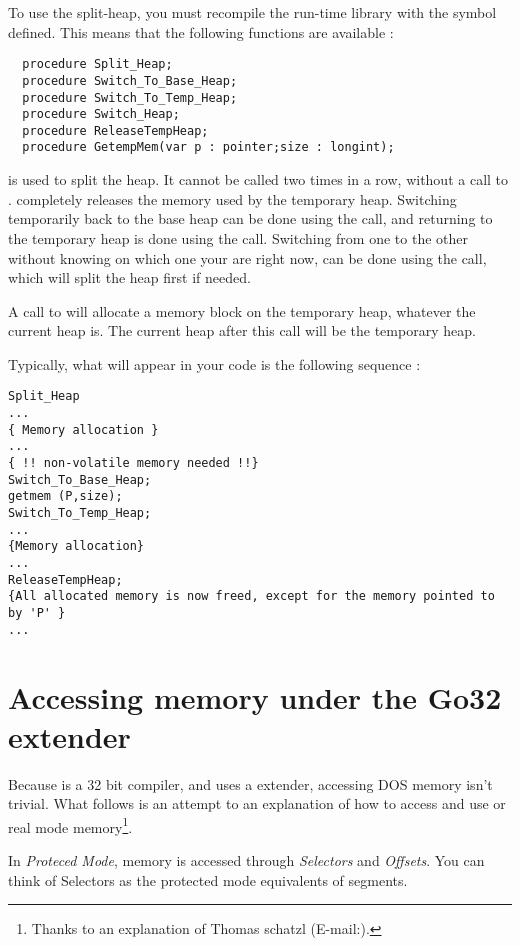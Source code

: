 \documentclass{report}
\begin{document}
To use the split-heap, you must recompile the run-time library with the 
symbol defined. 
This means that the following functions are available :
\begin{verbatim}
  procedure Split_Heap;
  procedure Switch_To_Base_Heap;
  procedure Switch_To_Temp_Heap;
  procedure Switch_Heap;
  procedure ReleaseTempHeap;
  procedure GetempMem(var p : pointer;size : longint);
\end{verbatim}
 is used to split the heap. It cannot be called two times
in a row, without a call to . 
completely releases the memory used by the temporary heap.
Switching temporarily back to the base heap can be done using the
 call, and returning to the temporary heap is done
using the  call. Switching from one to the other
without knowing on which one your are right now, can be done using the
 call, which will split the heap first if needed.

A call to  will allocate a memory block on the temporary
heap, whatever the current heap is. The current heap after this call will be
the temporary heap.

Typically, what will appear in your code is the following sequence :
\begin{verbatim}
Split_Heap
...
{ Memory allocation }
...
{ !! non-volatile memory needed !!}
Switch_To_Base_Heap;
getmem (P,size);
Switch_To_Temp_Heap;
...
{Memory allocation}
...
ReleaseTempHeap;
{All allocated memory is now freed, except for the memory pointed to by 'P' }
...
\end{verbatim}

\section{Accessing \dos memory under the Go32 extender}
\label{se:AccessingDosMemory}

Because \fpc is a 32 bit compiler, and uses a \dos extender, accessing DOS
memory isn't trivial. What follows is an attempt to an explanation of how to
access and use \dos or real mode memory\footnote{Thanks to an explanation of
Thomas schatzl (E-mail:).}.

In {\em Proteced Mode}, memory is accessed through {\em Selectors} and 
{\em Offsets}. You can think of Selectors as the protected mode 
equivalents of segments.
\end{document}
